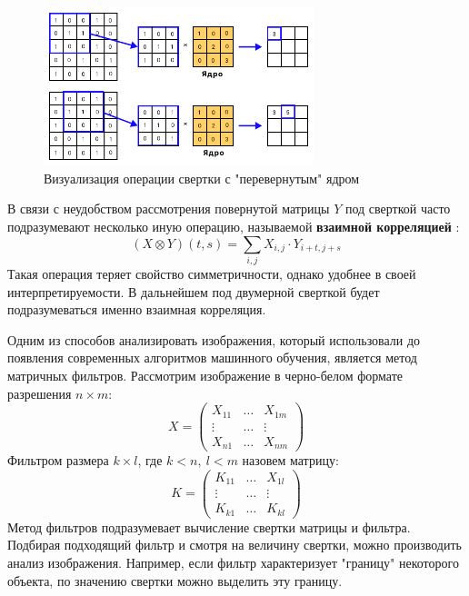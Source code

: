 \begin{figure}[h]
    \centering
    \includegraphics[width=0.7\textwidth]{images/conv_window.png}
    \caption{Визуализация операции свертки с "перевернутым" ядром}
    \label{fig:conv_window}
\end{figure}

В связи с неудобством рассмотрения повернутой матрицы $Y$ под сверткой часто подразумевают несколько иную операцию, называемой \textbf{взаимной корреляцией} \cite{dlbook}:
\begin{equation}
    (X \otimes Y)(t, s) = \sum_{i, j} X_{i, j} \cdot Y_{i + t, j + s}
\end{equation}
Такая операция теряет свойство симметричности, однако удобнее в своей интерпретируемости.
В дальнейшем под двумерной сверткой будет подразумеваться именно взаимная корреляция.

Одним из способов анализировать изображения, который использовали до появления современных алгоритмов машинного обучения, является метод матричных фильтров.
Рассмотрим изображение в черно-белом формате разрешения $n \times m$:
\[
    X = \begin{pmatrix}
        X_{11} & \ldots & X_{1m} \\
        \vdots & \ldots & \vdots \\
        X_{n1} & \ldots & X_{nm}
    \end{pmatrix}
\]
Фильтром размера $k \times l$, где $k < n,\ l < m$ назовем матрицу:
\[
    K = \begin{pmatrix}
        K_{11} & \ldots & X_{1l} \\
        \vdots & \ldots & \vdots \\
        K_{k1} & \ldots & K_{kl}
    \end{pmatrix}
\]
Метод фильтров подразумевает вычисление свертки матрицы и фильтра.
Подбирая подходящий фильтр и смотря на величину свертки, можно производить анализ изображения.
Например, если фильтр характеризует "границу" некоторого объекта, по значению свертки можно выделить эту границу.

